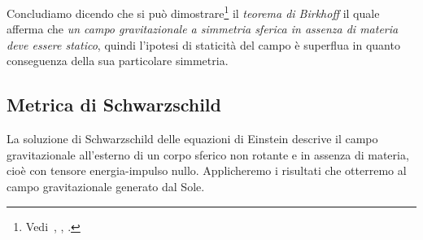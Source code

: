 Concludiamo dicendo che si può
dimostrare\footnote{Vedi~\textcite[390-393]{landau:campi},
  \textcite[843-844]{misner:gravitation},
  \textcite[335-337]{weinberg:gravitation}.}
il \emph{teorema di Birkhoff} il quale afferma che
\emph{un campo gravitazionale a simmetria sferica in assenza di materia deve
  essere statico},
quindi l'ipotesi di staticità del campo è superflua in quanto conseguenza della
sua particolare simmetria.

\subsection{Metrica di Schwarzschild}
\label{sec:metrica-schwarzschild}

La soluzione di Schwarzschild delle equazioni di Einstein descrive il campo
gravitazionale all'esterno di un corpo sferico non rotante e in assenza di
materia, cioè con tensore energia-impulso nullo.  Applicheremo i risultati che
otterremo al campo gravitazionale generato dal Sole.


